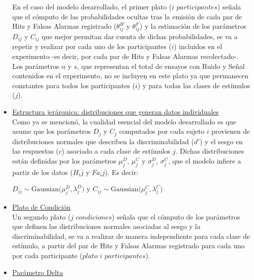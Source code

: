 \begin{itemize}
En el caso del modelo desarrollado, el primer plato ($i$ $participantes$) señala que el cómputo de las probabilidades ocultas tras la emisión de cada par de Hits y Falsas Alarmas registrado ($\theta^H_{ij}$ y $\theta^F_{ij}$) y la estimación de los parámetros $D_{ij}$ y $C_{ij}$ que mejor permitan dar cuenta de dichas probabilidades, se va a repetir y realizar por cada uno de los participantes ($i$) incluidos en el experimento -es decir, por cada par de Hits y Falsas Alarmas recolectado-. Los parámetros $n$ y $s$, que representan el total de ensayos con Ruido y Señal contenidos en el experimento, no se incluyen en este plato ya que permanecen constantes para todos los participantes ($i$) y para todas las clases de estímulos ($j$).\\

\item \underline{Estructura jerárquica: distribuciones que generan datos individuales}\\

Como ya se mencionó, la cualidad esencial del modelo desarrollado es que asume que los parámetros $D_{j}$ y $C_{j}$ computados por cada sujeto $i$ provienen de distribuciones normales que describen la discriminabilidad ($d'$) y el sesgo en las respuestas ($c$) asociado a cada clase de estímulos $j$. Dichas distribuciones están definidas por los parámetros $\mu^D_{j}$, $\mu^C_{j}$ y $\sigma^D_{j}$, $\sigma^C_{j}$, que el modelo infiere a partir de los datos ($H_ij$ y $Fa_ij$). Es decir:

\begin{center}
$D_{ij}\sim \mathrm{Gaussian}\bigl(\mu^D_{j},\lambda^D_{j})$ \qquad y \qquad $C_{ij}\sim \mathrm{Gaussian}\bigl(\mu^C_{j},\lambda^C_{j})$\\
\end{center}

\item \underline{Plato de Condición}\\

Un segundo plato ($j$ $condiciones$) señala que el cómputo de los parámetros que definen las distribuciones normales asociadas al sesgo y la discriminabilidad, se va a realizar de manera independiente para cada clase de estímulo, a partir del par de Hits y Falsas Alarmas registrado para cada uno por cada participante ($plato$ $i$ $participantes$).\\

\item \underline{Parámetro Delta}\\


\end{itemize}
